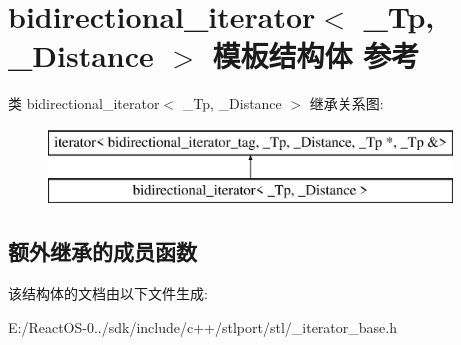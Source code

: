 \hypertarget{structbidirectional__iterator}{}\section{bidirectional\+\_\+iterator$<$ \+\_\+\+Tp, \+\_\+\+Distance $>$ 模板结构体 参考}
\label{structbidirectional__iterator}
类 bidirectional\+\_\+iterator$<$ \+\_\+\+Tp, \+\_\+\+Distance $>$ 继承关系图\+:\begin{figure}[H]
\begin{center}
\leavevmode
\includegraphics[height=2.000000cm]{structbidirectional__iterator}
\end{center}
\end{figure}
\subsection*{额外继承的成员函数}


该结构体的文档由以下文件生成\+:\begin{DoxyCompactItemize}
\item 
E\+:/\+React\+O\+S-\/0../sdk/include/c++/stlport/stl/\+\_\+iterator\+\_\+base.\+h\end{DoxyCompactItemize}
